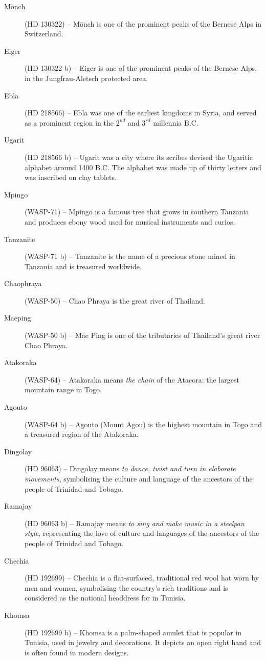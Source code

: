 \begin{description}
\item[Mönch] (HD 130322) -- Mönch is one of the prominent peaks of the Bernese Alps in Switzerland.
\item[Eiger] (HD 130322 b) -- Eiger is one of the prominent peaks of the Bernese Alps, in the Jungfrau-Aletsch protected area.
\item[Ebla] (HD 218566) -- Ebla was one of the earliest kingdoms in Syria, and served as a prominent region in the $2^{nd}$ and $3^{rd}$ millennia B.C.
\item[Ugarit] (HD 218566 b) -- Ugarit was a city where its scribes devised the Ugaritic alphabet around 1400 B.C. The alphabet was made up of thirty letters and was inscribed on clay tablets.
\item[Mpingo] (WASP-71) -- Mpingo is a famous tree that grows in southern Tanzania and produces ebony wood used for musical instruments and curios.
\item[Tanzanite] (WASP-71 b) -- Tanzanite is the name of a precious stone mined in Tanzania and is treasured worldwide.
\item[Chaophraya] (WASP-50) -- Chao Phraya is the great river of Thailand.
\item[Maeping] (WASP-50 b) -- Mae Ping is one of the tributaries of Thailand's great river Chao Phraya.
\item[Atakoraka] (WASP-64) -- Atakoraka means \textit{the chain} of the Atacora: the largest mountain range in Togo.
\item[Agouto] (WASP-64 b) -- Agouto (Mount Agou) is the highest mountain in Togo and a treasured region of the Atakoraka.
\item[Dingolay] (HD 96063) -- Dingolay means \textit{to dance, twist and turn in elaborate movements}, symbolising the culture and language of the ancestors of the people of Trinidad and Tobago.
\item[Ramajay] (HD 96063 b) -- Ramajay means \textit{to sing and make music in a steelpan style}, representing the love of culture and languages of the ancestors of the people of Trinidad and Tobago.
\item[Chechia] (HD 192699) -- Chechia is a flat-surfaced, traditional red wool hat worn by men and women, symbolising the country's rich traditions and is considered as the national headdress for in Tunisia.
\item[Khomsa] (HD 192699 b) -- Khomsa is a palm-shaped amulet that is popular in Tunisia, used in jewelry and decorations. It depicts an open right hand and is often found in modern designs.

\end{description}

